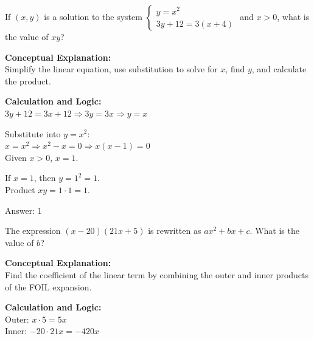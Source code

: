 \documentclass[11pt,paper=a4,answers]{exam}
\begin{document}
\begin{questions}
\question
If $(x, y)$ is a solution to the system $\begin{cases} y = x^2 \\ 3y + 12 = 3(x+4) \end{cases}$ and $x > 0$, what is the value of $xy$?

\begin{solution}
\textbf{Conceptual Explanation:} \\
Simplify the linear equation, use substitution to solve for $x$, find $y$, and calculate the product.

\vspace{20pt}

\textbf{Calculation and Logic:} \\
$3y + 12 = 3x + 12 \Rightarrow 3y = 3x \Rightarrow y = x$

\vspace{10pt}

Substitute into $y = x^2$: \\
$x = x^2 \Rightarrow x^2 - x = 0 \Rightarrow x(x-1) = 0$ \\
Given $x > 0$, $x = 1$.

\vspace{10pt}

If $x = 1$, then $y = 1^2 = 1$. \\
Product $xy = 1 \cdot 1 = 1$.

\vspace{25pt}

Answer: \colorbox{yellow!100}{1}
\end{solution}

\vspace{40pt}

\question
The expression $(x-20)(21x+5)$ is rewritten as $ax^2 + bx + c$. What is the value of $b$?

\begin{solution}
\textbf{Conceptual Explanation:} \\
Find the coefficient of the linear term by combining the outer and inner products of the FOIL expansion.

\vspace{20pt}

\textbf{Calculation and Logic:} \\
Outer: $x \cdot 5 = 5x$ \\
Inner: $-20 \cdot 21x = -420x$


\end{solution}
\end{questions}
\end{document}
